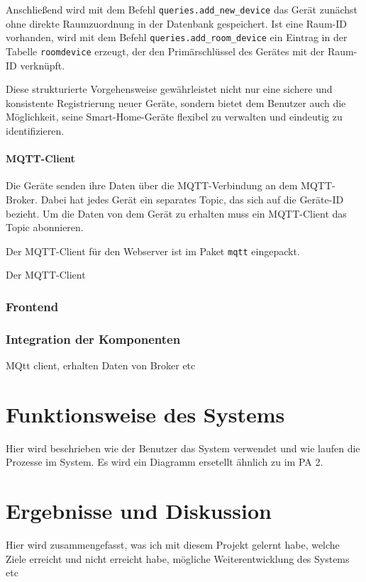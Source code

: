 \documentclass[12pt, letterpaper]{article}
\begin{document}
  \par Anschließend wird mit dem Befehl \texttt{queries.add\_new\_device} das Gerät zunächst ohne direkte Raumzuordnung in der Datenbank gespeichert. Ist eine Raum-ID vorhanden, wird mit dem Befehl \texttt{queries.add\_room\_device} ein Eintrag in der Tabelle \texttt{roomdevice} erzeugt, der den Primärschlüssel des Gerätes mit der Raum-ID verknüpft.
  \par Diese strukturierte Vorgehensweise gewährleistet nicht nur eine sichere und konsistente Registrierung neuer Geräte, sondern bietet dem Benutzer auch die Möglichkeit, seine Smart-Home-Geräte flexibel zu verwalten und eindeutig zu identifizieren.
 \paragraph{MQTT-Client}
 \par Die Geräte senden ihre Daten über die MQTT-Verbindung an dem MQTT-Broker. Dabei hat jedes Gerät ein separates Topic, das sich auf die Geräte-ID bezieht. Um die Daten von dem Gerät zu erhalten muss ein MQTT-Client das Topic abonnieren.
 \par Der MQTT-Client für den Webserver ist im Paket \texttt{mqtt} eingepackt. 
 \par Der MQTT-Client 
  \subsubsection{Frontend}
  \subsubsection{Integration der Komponenten}
  \par MQtt client, erhalten Daten von Broker etc

\newpage
\section{Funktionsweise des Systems}
\par Hier wird beschrieben wie der Benutzer das System verwendet und wie laufen die Prozesse im System. Es wird ein Diagramm ersetellt ähnlich zu im PA 2. 
\section{Ergebnisse und Diskussion}
\par Hier wird zusammengefasst, was ich mit diesem Projekt gelernt habe, welche Ziele erreicht und nicht erreicht habe, mögliche Weiterentwicklung des Systems etc
\newpage
\end{document}
